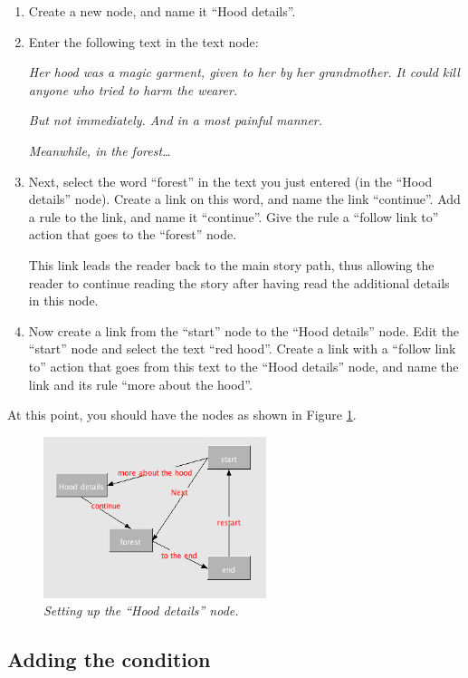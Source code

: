 \documentclass{article}
\begin{document}
\begin{enumerate}
  \item Create a new node, and name it ``Hood details''.
  \item Enter the following text in the text node:

\textit{Her hood was a magic garment, given to her by her grandmother.
It could kill anyone who tried to harm the wearer.}

\textit{But not immediately. And in a most painful manner.}

\textit{Meanwhile, in the forest\ldots}

\item Next, select the word ``forest'' in the text you just entered (in the
``Hood details'' node). Create a link on this word, and name the link
``continue''. Add a rule to the link, and name it ``continue''. Give the rule a
``follow link to'' action that goes to the ``forest'' node.

This link leads the reader back to the main story path, thus allowing the
reader to continue reading the story after having read the additional details in
this node.

\item Now create a link from the ``start'' node to the ``Hood details'' node.
Edit the ``start'' node and select the text ``red hood''. Create a link with a
``follow link to'' action that goes from this text to the ``Hood details'' node,
and name the link and its rule ``more about the hood''.
\end{enumerate}

At this point, you should have the nodes as shown in Figure
\ref{fig:tut1:setting_up_hood_details}.

 
\begin{figure}[ht]
  \centering
  \includegraphics[width=6.5cm]{images/hypedyn-tutorial-1-figure-12}
  \caption{\textit{Setting up the ``Hood details'' node.}}
  \label{fig:tut1:setting_up_hood_details}
\end{figure} 

\subsection{Adding the condition}
\end{document}

